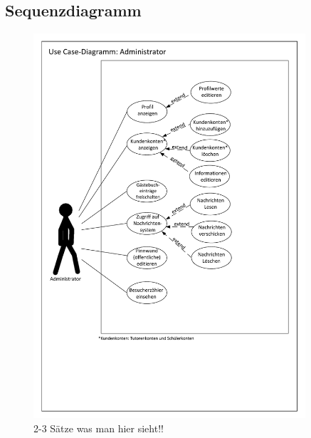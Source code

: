 \documentclass[10pt,a4paper]{scrartcl}
\begin{document}
\subsection{Sequenzdiagramm}
\begin{figure}[!htbp]
\includegraphics[width=0.9\textwidth]{./Source/UseCaseAdministrator_11.pdf} \caption{2-3 Sätze was man hier sieht!!}
\end{figure}
\newpage
\end{document}
